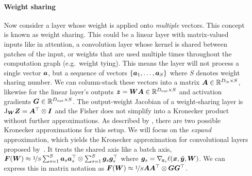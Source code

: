 \paragraph{Weight sharing}
Now consider a layer whose weight is applied onto \emph{multiple} vectors.
This concept is known as weight sharing.
This could be a linear layer with matrix-valued inputs like in attention, a convolution layer whose kernel is shared between patches of the input, or weights that are used multiple times throughout the computation graph (e.g.\, weight tying).
This means the layer will not process a single vector ${\bm{a}}$, but a sequence of vectors $\left\{ {\bm{a}}_1, \dots, {\bm{a}}_S \right\}$ where $S$ denotes weight sharing number.
We can column-stack these vectors into a matrix ${\bm{A}} \in {\mathbb{R}}^{D_{\text{in}}\times S}$, likewise for the linear layer's outputs ${\bm{z}} = {\bm{W}} {\bm{A}} \in {\mathbb{R}}^{D_{\text{out}}\times S}$ and activation gradients ${\bm{G}} \in {\mathbb{R}}^{D_{\text{out}} \times S}$.
The output-weight Jacobian of a weight-sharing layer is $\mathrm{J}_{{\bm{W}}} {\bm{Z}} = {\bm{A}}^{\top} \otimes {\bm{I}}$ \cite[see e.g.][]{dangel2020modular} and the Fisher does not simplify into a Kronecker product without further approximations.
As described by \citet{eschenhagen2023kroneckerfactored}, there are two possible Kronecker approximations for this setup.
We will focus on the \emph{expand} approximation, which yields the Kronecker approximation for convolutional layers proposed by~\citet{grosse2016kroneckerfactored}.
It treats the shared axis like a batch axis,
${\bm{F}}({\bm{W}}) \approx \nicefrac{1}{S} \sum_{s=1}^S {\bm{a}}_s {\bm{a}}_s^{\top} \otimes \sum_{s=1}^S {\bm{g}}_s {\bm{g}}_s^{\top}$ where ${\bm{g}}_s = \nabla_{\!{{\bm{z}}_s}} \ell({\bm{x}}, \hat{{\bm{y}}}, {\bm{W}})$.
We can express this in matrix notation as ${\bm{F}}({\bm{W}}) \approx \nicefrac{1}{S} {\bm{A}} {\bm{A}}^{\top} \otimes {\bm{G}} {\bm{G}}^{\top}$.


